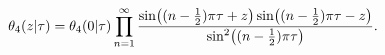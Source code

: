 \[\mathop{\theta_{4}\/}\nolimits\!\left(z\middle|\tau\right)=\mathop{\theta_{4}%
\/}\nolimits\!\left(0\middle|\tau\right)\prod_{n=1}^{\infty}\frac{\mathop{\sin%
\/}\nolimits\!\left((n-\tfrac{1}{2})\pi\tau+z\right)\mathop{\sin\/}\nolimits\!%
\left((n-\tfrac{1}{2})\pi\tau-z\right)}{{\mathop{\sin\/}\nolimits^{2}}\!\left(%
(n-\tfrac{1}{2})\pi\tau\right)}.\]